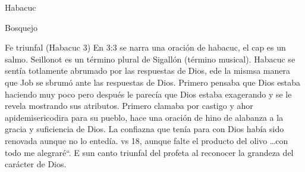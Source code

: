 \documentclass[12pt]{article}
\begin{document}
\begin{section}{Habacuc}
\begin{subsection}{Bosquejo}
\begin{subsubsection}{Fe triunfal (Habacuc 3)}
			En 3:3 se narra una oración de habacuc, el cap es un salmo. Seillonot es un término plural de Sigallón (término musical). Habacuc se sentía totlamente abrumado por las respuestas de Dios, ede la mismsa manera que Job se sbrumó ante las respuestas de Dios. Primero pensaba que Dios estaba haciendo muy poco pero después le parecía que Dios estaba exagerando y se le revela mostrando sus atributos. Primero clamaba por castigo y ahor apidemisericodira para su pueblo, hace una oración de hino de alabanza a la gracia y suficiencia de Dios. La confiazna que tenía para con Dios había sido renovada aunque no lo entedía. vs 18, aunque falte el producto del olivo \ldots con todo me alegraré``. E sun canto triunfal del profeta al reconocer la grandeza del carácter de Dios.
		\end{subsubsection}
	\end{subsection}
\end{section}
\end{document}
